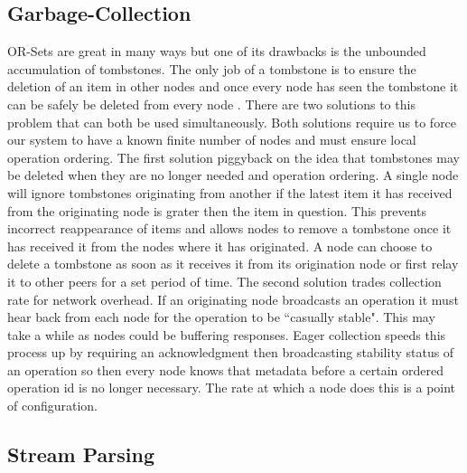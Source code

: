 \documentclass{article}
\begin{document}
\begin{multicols}{2}
\begin{refsection}
\subsection*{Garbage-Collection}

OR-Sets are great in many ways but one of its drawbacks is the unbounded
accumulation of tombstones. The only job of a tombstone is to ensure the
deletion of an item in other nodes and once every node has seen the
tombstone it can be safely be deleted from every node \cite{bauwens_memory_2019}.
There are two solutions to this problem that can both be used
simultaneously. Both solutions require us to force our system to have a
known finite number of nodes and must ensure local operation ordering.
The first solution piggyback on the idea that tombstones may be deleted
when they are no longer needed and operation ordering. A single node will
ignore tombstones originating from another if the latest item it has
received from the originating node is grater then the item in question.
This prevents incorrect reappearance of items and allows nodes to remove
a tombstone once it has received it from the nodes where it has originated.
A node can choose to delete a tombstone as soon as it receives it
from its origination node or first relay it to other peers for a set
period of time. The second solution trades collection rate for network
overhead. If an originating node broadcasts an operation it must hear
back from each node for the operation to be ``casually stable". This
may take a while as nodes could be buffering responses. Eager collection
speeds this process up by requiring an acknowledgment then broadcasting
stability status of an operation so then every node knows that metadata
before a certain ordered operation id is no longer necessary. The rate
at which a node does this is a point of configuration.

\subsection*{Stream Parsing}


\end{refsection}
\end{multicols}
\end{document}
